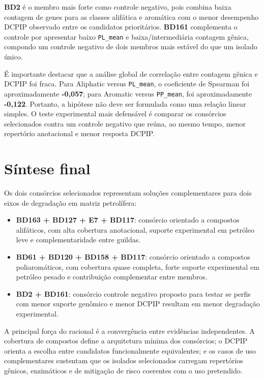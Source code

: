 \documentclass[12pt,a4paper]{article}
\begin{document}
\textbf{BD2} é o membro mais forte como controle negativo, pois combina baixa contagem de genes para as classes alifática e aromática com o menor desempenho DCPIP observado entre os candidatos prioritários. \textbf{BD161} complementa o controle por apresentar baixo \texttt{PL\_mean} e baixa/intermediária contagem gênica, compondo um controle negativo de dois membros mais estável do que um isolado único.

É importante destacar que a análise global de correlação entre contagem gênica e DCPIP foi fraca. Para Aliphatic versus \texttt{PL\_mean}, o coeficiente de Spearman foi aproximadamente \textbf{-0,057}; para Aromatic versus \texttt{PP\_mean}, foi aproximadamente \textbf{-0,122}. Portanto, a hipótese não deve ser formulada como uma relação linear simples. O teste experimental mais defensável é comparar os consórcios selecionados contra um controle negativo que reúna, ao mesmo tempo, menor repertório anotacional e menor resposta DCPIP.

\section{Síntese final}

Os dois consórcios selecionados representam soluções complementares para dois eixos de degradação em matriz petrolífera:

\begin{itemize}
    \item \textbf{BD163 + BD127 + E7 + BD117}: consórcio orientado a compostos alifáticos, com alta cobertura anotacional, suporte experimental em petróleo leve e complementaridade entre guildas.
    \item \textbf{BD61 + BD120 + BD158 + BD117}: consórcio orientado a compostos poliaromáticos, com cobertura quase completa, forte suporte experimental em petróleo pesado e contribuição complementar entre membros.
    \item \textbf{BD2 + BD161}: consórcio controle negativo proposto para testar se perfis com menor suporte genômico e menor DCPIP resultam em menor degradação experimental.
\end{itemize}

A principal força do racional é a convergência entre evidências independentes. A cobertura de compostos define a arquitetura mínima dos consórcios; o DCPIP orienta a escolha entre candidatos funcionalmente equivalentes; e os casos de uso complementares sustentam que os isolados selecionados carregam repertórios gênicos, enzimáticos e de mitigação de risco coerentes com o uso pretendido.
\end{document}
